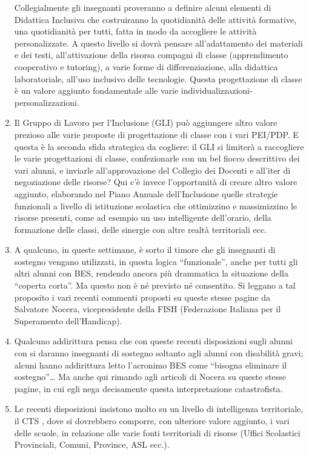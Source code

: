 \begin{enumerate}
	Collegialmente gli insegnanti proveranno a definire alcuni elementi di Didattica Inclusiva che costruiranno la quotidianità delle attività formative, una quotidianità per tutti, fatta in modo da accogliere le attività personalizzate. A questo livello si dovrà pensare all'adattamento dei materiali e dei testi, all'attivazione della risorsa compagni di classe (apprendimento cooperativo e tutoring), a varie forme di differenziazione, alla didattica laboratoriale, all'uso inclusivo delle tecnologie. Questa progettazione di classe è un valore aggiunto fondamentale alle varie individualizzazioni-personalizzazioni.
	\item Il Gruppo di Lavoro per l'Inclusione (GLI) può aggiungere altro valore prezioso alle varie proposte di progettazione di classe con i vari PEI/PDP. E questa è la seconda sfida strategica da cogliere: il GLI si limiterà a raccogliere le varie progettazioni di classe, confezionarle con un bel fiocco descrittivo dei vari alunni, e inviarle all'approvazione del Collegio dei Docenti e all'iter di negoziazione delle risorse? Qui c'è invece l'opportunità di creare altro valore aggiunto, elaborando nel Piano Annuale dell'Inclusione quelle strategie funzionali a livello di istituzione scolastica che ottimizzino e massimizzino le risorse presenti, come ad esempio un uso intelligente dell'orario, della formazione delle classi, delle sinergie con altre realtà territoriali ecc.
	\item  A qualcuno, in queste settimane, è sorto il timore che gli insegnanti di sostegno vengano utilizzati, in questa logica “funzionale”, anche per tutti gli altri alunni con BES, rendendo ancora più drammatica la situazione della “coperta corta”. Ma questo non è né previsto né consentito. Si leggano a tal proposito i vari recenti commenti proposti su queste stesse pagine da Salvatore Nocera, vicepresidente della FISH (Federazione Italiana per il Superamento dell'Handicap).
	\item Qualcuno addirittura pensa che con queste recenti disposizioni sugli alunni con  si daranno insegnanti di sostegno soltanto agli alunni con disabilità gravi; alcuni hanno addirittura letto l'acronimo BES come “bisogna eliminare il sostegno”… Ma anche qui rimando agli articoli di Nocera su queste stesse pagine, in cui egli nega decisamente questa interpretazione catastrofista.
	\item  Le recenti disposizioni insistono molto su un livello di intelligenza territoriale, il CTS , dove si dovrebbero comporre, con ulteriore valore aggiunto, i vari   delle scuole, in relazione alle varie fonti territoriali di risorse (Uffici Scolastici Provinciali, Comuni, Province, ASL ecc.).
	

\end{enumerate}
